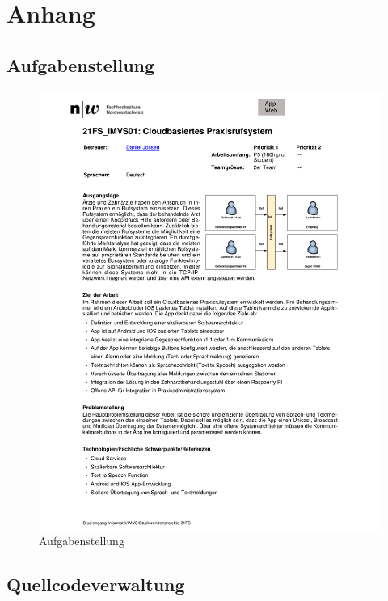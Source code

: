 
\renewcommand\refname{Literaturverzeichnis}
\printbibliography
\cleardoublepage
\listoffigures


\clearpage

\section{Anhang}
    \subsection{Aufgabenstellung}
        \begin{figure}[h]
            \centering
            \begin{minipage}[b]{0.8\textwidth}
                \includegraphics[width=\textwidth]{graphics/aufgabenstellung}
                \caption{Aufgabenstellung}
            \end{minipage}
        \end{figure}

    \subsection{Quellcodeverwaltung}

